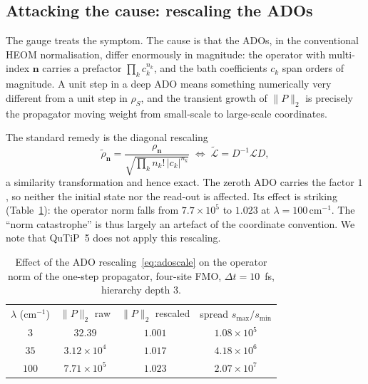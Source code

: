 \documentclass[aps,prx,twocolumn,superscriptaddress,nofootinbib,longbibliography]{revtex4-2}
\theoremstyle{plain}
\newcommand{\norm}[1]{\lVert#1\rVert}
\begin{document}
\subsection{Attacking the cause: rescaling the ADOs}

The gauge treats the symptom.  The cause is that the ADOs, in the conventional
HEOM normalisation, differ enormously in magnitude: the operator with
multi-index $\mathbf n$ carries a prefactor $\prod_k c_k^{n_k}$, and the bath
coefficients $c_k$ span orders of magnitude.  A unit step in a deep ADO means
something numerically very different from a unit step in $\rho_S$, and the
transient growth of $\norm{P}_2$ is precisely the propagator moving weight from
small-scale to large-scale coordinates.

The standard remedy \cite{Shi2009} is the diagonal rescaling
\begin{equation}
\tilde\rho_{\mathbf n}
 =\frac{\rho_{\mathbf n}}{\sqrt{\prod_k n_k!\,|c_k|^{n_k}}}
\;\Longleftrightarrow\;
\tilde{\mathcal L}=D^{-1}\mathcal L D,
\label{eq:adoscale}
\end{equation}
a similarity transformation and hence exact.  The zeroth ADO carries the factor
$1$, so neither the initial state nor the read-out is affected.  Its effect is
striking (Table~\ref{tab:scaling}): the operator norm falls from
$7.7\times10^{5}$ to $1.023$ at $\lambda=100\,\mathrm{cm}^{-1}$.  The
``norm catastrophe'' is thus largely an artefact of the coordinate convention.
We note that QuTiP~5 does not apply this rescaling.

\begin{table}[t]
\caption{Effect of the ADO rescaling~\eqref{eq:adoscale} on the operator norm of
the one-step propagator, four-site FMO, $\Delta t=10$~fs, hierarchy depth $3$.}
\label{tab:scaling}
\begin{ruledtabular}
\begin{tabular}{cccc}
$\lambda$ (cm$^{-1}$) & $\norm{P}_2$ raw & $\norm{P}_2$ rescaled & spread $s_{\max}/s_{\min}$\\
\colrule
$3$   & $32.39$              & $1.001$ & $1.08\times10^{5}$\\
$35$  & $3.12\times10^{4}$   & $1.017$ & $4.18\times10^{6}$\\
$100$ & $7.71\times10^{5}$   & $1.023$ & $2.07\times10^{7}$\\
\end{tabular}
\end{ruledtabular}
\end{table}
\end{document}
